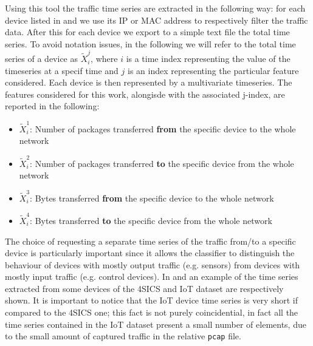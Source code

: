 Using this tool the traffic time series are extracted in the following way: for each device listed in  and  we use its IP or MAC address to respectively filter the traffic data. After this for each device we export to a simple text file the total time series. To avoid notation issues, in the following we will refer to the total time series of a device as ${\tilde{X}_i^j}$, where $i$ is a time index representing the value of the timeseries at a specif time and $j$ is an index representing the particular feature considered. 
Each device is then represented by a multivariate timeseries. The features considered for this work, alongisde with the associated j-index, are reported in the following:
\begin{itemize}[noitemsep]
    \item ${\tilde{X}_i^1}$: Number of packages transferred \textbf{from} the specific device to the whole network
    \item ${\tilde{X}_i^2}$: Number of packages transferred \textbf{to} the specific device from the whole network
    \item ${\tilde{X}_i^3}$: Bytes transferred \textbf{from} the specific device to the whole network
    \item ${\tilde{X}_i^4}$: Bytes transferred \textbf{to} the specific device from the whole network
\end{itemize}

The choice of requesting a separate time series of the traffic from/to a specific device is particularly important since it allows the classifier to distinguish the behaviour of devices with mostly output traffic (e.g. sensors) from devices with mostly input traffic (e.g. control devices).
In  and  an example of the time series extracted from some devices of the 4SICS and IoT dataset are respectively shown. It is important to notice that the IoT device time series is very short if compared to the 4SICS one; this fact is not purely coincidential, in fact all the time series contained in the IoT dataset present a small number of elements, due to the small amount of captured traffic in the relative \texttt{pcap} file.


